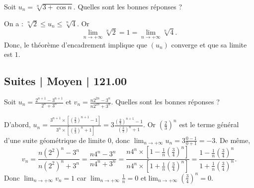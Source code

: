 \begin{question}
Soit $\displaystyle u_n=\sqrt[n]{3+\cos n}$. Quelles sont les bonnes réponses ?
\begin{answers}
\end{answers}
\begin{explanations}
On a : $\displaystyle \sqrt[n]{2}\leq u_n\leq \sqrt[n]{4}$. Or 
$$\lim _{n\to +\infty}\sqrt[n]{2}=1=\lim _{n\to +\infty}\sqrt[n]{4}.$$
Donc, le théorème d'encadrement implique que $(u_n)$ converge et que sa limite est $1$.
\end{explanations}
\end{question}




\subsection{Suites | Moyen | 121.00}



\begin{question}
Soit $\displaystyle u_n=\frac{2^{n+1}-3^{n+1}}{2^n+3^n}$ et $\displaystyle v_n=\frac{n2^{2n}-3^n}{n2^{2n}+3^n}$. Quelles sont les bonnes réponses ?
\begin{answers}  
\end{answers}
\begin{explanations}
D'abord, $\displaystyle u_n=\frac{3^{n+1}\times \left[\left(\frac{2}{3}\right)^{n+1}-1\right]}{3^n\times \left[\left(\frac{2}{3}\right)^{n}+1\right]}=3\frac{\left(\frac{2}{3}\right)^{n+1}-1}{\left(\frac{2}{3}\right)^n+1}$. Or $\displaystyle \left(\frac{2}{3}\right)^n$ est le terme général d'une suite géométrique de limite $0$, donc $\displaystyle \lim _{n\to +\infty}u_n=3\frac{0-1}{0+1}=-3$. De même, 
$$\displaystyle v_n=\frac{n(2^2)^n-3^n}{n(2^2)^n+3^n}=\frac{n4^n-3^n}{n4^n+3^n}=\frac{n4^n\times \left[1-\frac{1}{n}\left(\frac{3}{4}\right)^{n}\right]}{n4^n\times \left[1+\frac{1}{n}\left(\frac{3}{4}\right)^{n}\right]}=\frac{1-\frac{1}{n}\left(\frac{3}{4}\right)^{n}}{1+\frac{1}{n}\left(\frac{3}{4}\right)^{n}}.$$
Donc $\displaystyle \lim _{n\to +\infty}v_n=1$ car $\displaystyle \lim _{n\to +\infty}\frac{1}{n}=0$ et$\displaystyle \lim _{n\to +\infty}\left(\frac{3}{4}\right)^{n}=0$.
\end{explanations}
\end{question}



